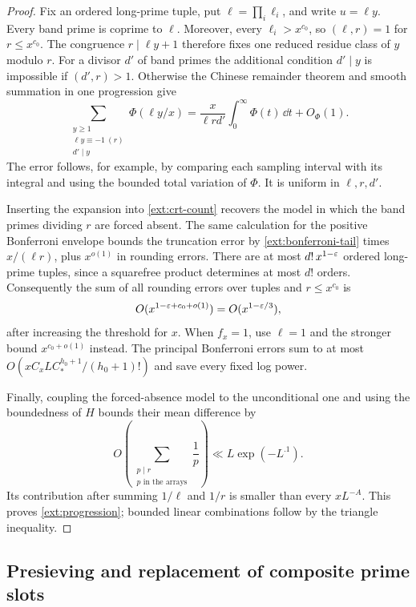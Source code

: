 \begin{proof}
Fix an ordered long-prime tuple, put $\ell=\prod_i\ell_i$, and
write $u=\ell y$.  Every band prime is coprime to $\ell$.
Moreover, every $\ell_i>x^{c_0}$, so $(\ell,r)=1$ for
$r\leq x^{c_0}$.  The congruence $r\mid\ell y+1$ therefore fixes
one reduced residue class of $y$ modulo $r$.  For a divisor $d'$
of band primes the additional condition $d'\mid y$ is impossible
if $(d',r)>1$.  Otherwise the Chinese remainder theorem and smooth
summation in one progression give
\begin{equation}\label{ext:crt-count}
 \sum_{\substack{y\geq1\\\ell y\equiv-1\ (r)\\d'\mid y}}
        \Phi(\ell y/x)
 =\frac{x}{\ell r d'}\int_0^\infty\Phi(t)\,\dd t+O_\Phi(1).
\end{equation}
The error follows, for example, by comparing each sampling interval
with its integral and using the bounded total variation of $\Phi$.
It is uniform in $\ell,r,d'$.

Inserting the expansion into \eqref{ext:crt-count} recovers the
model in which the band primes dividing $r$ are forced absent.
The same calculation for the positive Bonferroni envelope bounds
the truncation error by \eqref{ext:bonferroni-tail} times
$x/(\ell r)$, plus $x^{o(1)}$ in rounding errors.
There are at most $d!\,x^{1-\varepsilon}$ ordered long-prime tuples,
since a squarefree product determines at most $d!$ orders.
Consequently the sum of all rounding errors over tuples and
$r\leq x^{c_0}$ is
\begin{equation}\label{ext:rounding-sum}
 O(x^{1-\varepsilon+c_0+o(1)})=O(x^{1-\varepsilon/3}),
\end{equation}
after increasing the threshold for $x$.  When $f_x=1$, use
$\ell=1$ and the stronger bound $x^{c_0+o(1)}$ instead.
The principal Bonferroni errors sum to at most
$O(x C_x L C_*^{h_0+1}/(h_0+1)!)$ and save every fixed log power.

Finally, coupling the forced-absence model to the unconditional
one and using the boundedness of $H$ bounds their mean difference
by
\[
 O\left(\sum_{\substack{p\mid r\\p\text{ in the arrays}}}\frac1p\right)
 \ll L\exp(-L^{.1}).
\]
Its contribution after summing $1/\ell$ and $1/r$ is smaller than
every $xL^{-A}$.  This proves \eqref{ext:progression}; bounded
linear combinations follow by the triangle inequality.
\end{proof}

\subsection{Presieving and replacement of composite prime slots}

